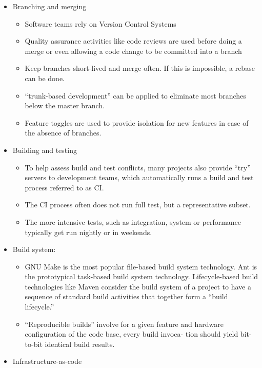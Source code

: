 \documentclass[]{book}
\providecommand{\tightlist}{%
  \setlength{\itemsep}{0pt}\setlength{\parskip}{0pt}}
\begin{document}
\begin{itemize}
\tightlist
\item
  Branching and merging

  \begin{itemize}
  \tightlist
  \item
    Software teams rely on Version Control Systems
  \item
    Quality assurance activities like code reviews are used before doing
    a merge or even allowing a code change to be committed into a branch
  \item
    Keep branches short-lived and merge often. If this is impossible, a
    rebase can be done.
  \item
    ``trunk-based development'' can be applied to eliminate most
    branches below the master branch.
  \item
    Feature toggles are used to provide isolation for new features in
    case of the absence of branches.
  \end{itemize}
\item
  Building and testing

  \begin{itemize}
  \tightlist
  \item
    To help assess build and test conflicts, many projects also provide
    ``try'' servers to development teams, which automatically runs a
    build and test process referred to as CI.
  \item
    The CI process often does not run full test, but a representative
    subset.
  \item
    The more intensive tests, such as integration, system or performance
    typically get run nightly or in weekends.
  \end{itemize}
\item
  Build system:

  \begin{itemize}
  \tightlist
  \item
    GNU Make is the most popular file-based build system technology. Ant
    is the prototypical task-based build system technology.
    Lifecycle-based build technologies like Maven consider the build
    system of a project to have a sequence of standard build activities
    that together form a ``build lifecycle.''
  \item
    ``Reproducible builds'' involve for a given feature and hardware
    configuration of the code base, every build invoca- tion should
    yield bit-to-bit identical build results.
  \end{itemize}
\item
  Infrastructure-as-code


\end{itemize}
\end{document}
